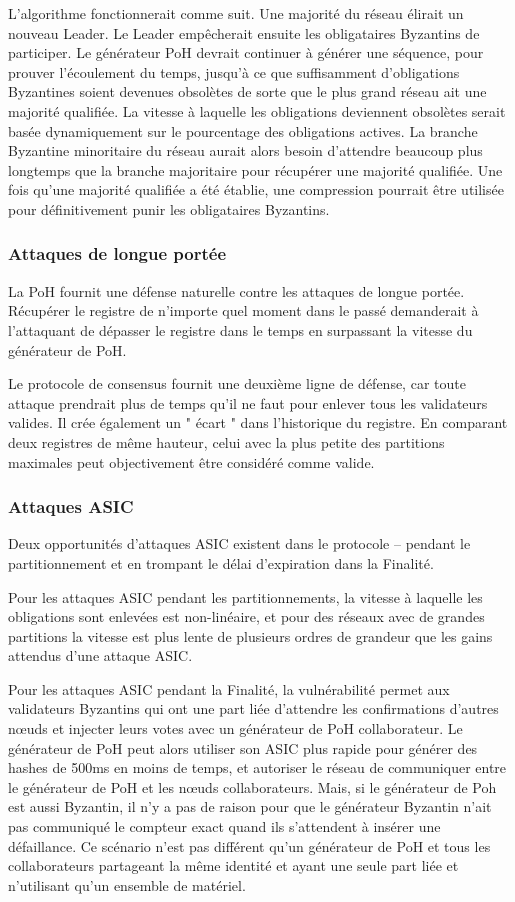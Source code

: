 \documentclass[12pt]{article}
\begin{document}
L’algorithme fonctionnerait comme suit. Une majorité du réseau élirait un nouveau Leader. Le Leader empêcherait ensuite les obligataires Byzantins de participer. Le générateur PoH devrait continuer à générer une séquence, pour prouver l’écoulement du temps, jusqu’à ce que suffisamment d’obligations Byzantines soient devenues obsolètes de sorte que le plus grand réseau ait une majorité qualifiée. La vitesse à laquelle les obligations deviennent obsolètes serait basée dynamiquement sur le pourcentage des obligations actives. La branche Byzantine minoritaire du réseau aurait alors besoin d’attendre beaucoup plus longtemps que la branche majoritaire pour récupérer une majorité qualifiée. Une fois qu’une majorité qualifiée a été établie, une compression pourrait être utilisée pour définitivement punir les obligataires Byzantins.

\subsubsection{Attaques de longue portée}\label{Censure}
La PoH fournit une défense naturelle contre les attaques de longue portée. Récupérer le registre de n’importe quel moment dans le passé demanderait à l’attaquant de dépasser le registre dans le temps en surpassant la vitesse du générateur de PoH.

Le protocole de consensus fournit une deuxième ligne de défense, car toute attaque prendrait plus de temps qu’il ne faut pour enlever tous les validateurs valides. Il crée également un " écart " dans l’historique du registre. En comparant deux registres de même hauteur, celui avec la plus petite des partitions maximales peut objectivement être considéré comme valide.

\subsubsection{Attaques ASIC}\label{Censure}

Deux opportunités d’attaques ASIC existent dans le protocole – pendant le partitionnement et en trompant le délai d’expiration dans la Finalité.

Pour les attaques ASIC pendant les partitionnements, la vitesse à laquelle les obligations sont enlevées est non-linéaire, et pour des réseaux avec de grandes partitions la vitesse est plus lente de plusieurs ordres de grandeur que les gains attendus d’une attaque ASIC.

Pour les attaques ASIC pendant la Finalité, la vulnérabilité permet aux validateurs Byzantins qui ont une part liée d’attendre les confirmations d’autres nœuds et injecter leurs votes avec un générateur de PoH collaborateur. Le générateur de PoH peut alors utiliser son ASIC plus rapide pour générer des hashes de 500ms en moins de temps, et autoriser le réseau de communiquer entre le générateur de PoH et les nœuds collaborateurs. Mais, si le générateur de Poh est aussi Byzantin, il n’y a pas de raison pour que le générateur Byzantin n’ait pas communiqué le compteur exact quand ils s’attendent à insérer une défaillance. Ce scénario n’est pas différent qu’un générateur de PoH et tous les collaborateurs partageant la même identité et ayant une seule part liée et n’utilisant qu’un ensemble de matériel.
\end{document}
